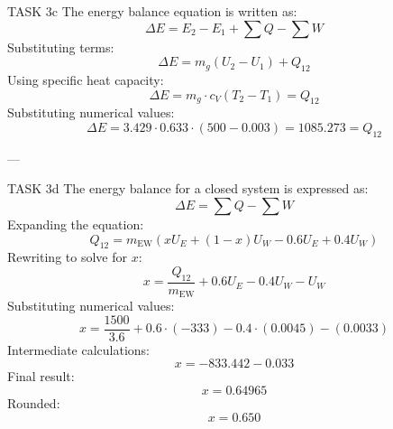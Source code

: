 TASK 3c  
The energy balance equation is written as:  
\[
\Delta E = E_2 - E_1 + \sum Q - \sum W
\]  
Substituting terms:  
\[
\Delta E = m_g (U_2 - U_1) + Q_{12}
\]  
Using specific heat capacity:  
\[
\Delta E = m_g \cdot c_V (T_2 - T_1) = Q_{12}
\]  
Substituting numerical values:  
\[
\Delta E = 3.429 \cdot 0.633 \cdot (500 - 0.003) = 1085.273 = Q_{12}
\]  

---

TASK 3d  
The energy balance for a closed system is expressed as:  
\[
\Delta E = \sum Q - \sum W
\]  
Expanding the equation:  
\[
Q_{12} = m_{\text{EW}} \left( x U_E + (1 - x) U_W - 0.6 U_E + 0.4 U_W \right)
\]  
Rewriting to solve for \( x \):  
\[
x = \frac{Q_{12}}{m_{\text{EW}}} + 0.6 U_E - 0.4 U_W - U_W
\]  
Substituting numerical values:  
\[
x = \frac{1500}{3.6} + 0.6 \cdot (-333) - 0.4 \cdot (0.0045) - (0.0033)
\]  
Intermediate calculations:  
\[
x = -833.442 - 0.033
\]  
Final result:  
\[
x = 0.64965
\]  
Rounded:  
\[
x = 0.650
\]